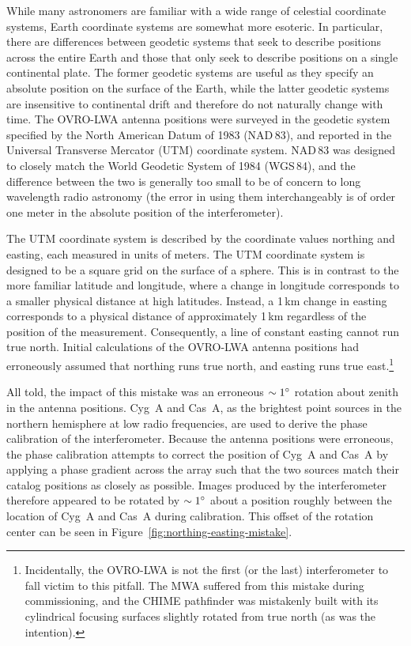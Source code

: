 \begin{bibunit}
While many astronomers are familiar with a wide range of celestial coordinate systems, Earth
coordinate systems are somewhat more esoteric. In particular, there are differences between geodetic
systems that seek to describe positions across the entire Earth and those that only seek to describe
positions on a single continental plate. The former geodetic systems are useful as they specify an
absolute position on the surface of the Earth, while the latter geodetic systems are insensitive to
continental drift and therefore do not naturally change with time. The OVRO-LWA antenna positions
were surveyed in the geodetic system specified by the North American Datum of 1983 (NAD\,83), and
reported in the Universal Transverse Mercator (UTM) coordinate system. NAD\,83 was designed to
closely match the World Geodetic System of 1984 (WGS\,84), and the difference between the two is
generally too small to be of concern to long wavelength radio astronomy (the error in using them
interchangeably is of order one meter in the absolute position of the interferometer).

The UTM coordinate system is described by the coordinate values northing and easting, each measured
in units of meters.  The UTM coordinate system is designed to be a square grid on the surface of a
sphere. This is in contrast to the more familiar latitude and longitude, where a change in longitude
corresponds to a smaller physical distance at high latitudes. Instead, a 1\,km change in easting
corresponds to a physical distance of approximately 1\,km regardless of the position of the
measurement. Consequently, a line of constant easting cannot run true north. Initial calculations of
the OVRO-LWA antenna positions had erroneously assumed that northing runs true north, and easting
runs true east.\footnote{
    Incidentally, the OVRO-LWA is not the first (or the last) interferometer to fall victim to this
    pitfall. The MWA suffered from this mistake during commissioning, and the CHIME pathfinder was
    mistakenly built with its cylindrical focusing surfaces slightly rotated from true north (as was
    the intention).
}

All told, the impact of this mistake was an erroneous $\sim 1\mbox{$^\circ$}$ rotation about zenith in the
antenna positions. Cyg~A and Cas~A, as the brightest point sources in the northern hemisphere at low
radio frequencies, are used to derive the phase calibration of the interferometer. Because the
antenna positions were erroneous, the phase calibration attempts to correct the position of Cyg~A
and Cas~A by applying a phase gradient across the array such that the two sources match their
catalog positions as closely as possible. Images produced by the interferometer therefore appeared
to be rotated by $\sim 1\mbox{$^\circ$}$ about a position roughly between the location of Cyg~A and Cas~A
during calibration. This offset of the rotation center can be seen in
Figure~\ref{fig:northing-easting-mistake}.


\end{bibunit}
